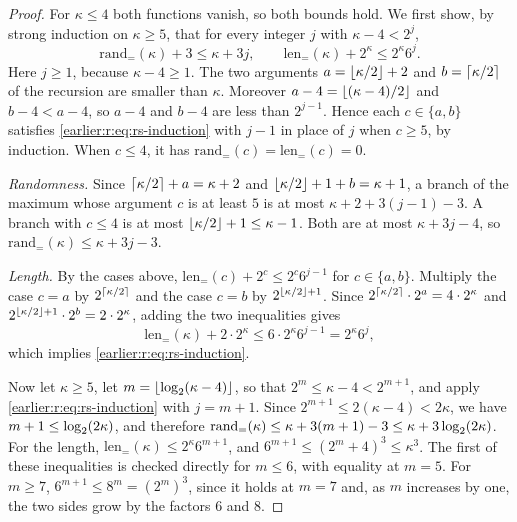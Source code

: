 \begin{proof}
For \(\kappa\le4\) both functions vanish, so both bounds hold. We first
show, by strong induction on \(\kappa\ge5\), that for every integer
\(j\) with \(\kappa-4<2^j\),
\begin{equation}\label{earlier:r:eq:rs-induction}
 \mathrm{rand}_=(\kappa)+3\le\kappa+3j,\qquad
 \mathrm{len}_=(\kappa)+2^\kappa\le2^\kappa6^j.
\end{equation}
Here \(j\ge1\), because \(\kappa-4\ge1\). The two arguments
\(a=\left\lfloor\kappa/2\right\rfloor+2\) and \(b=\left\lceil\kappa/2\right\rceil\) of the recursion are
smaller than \(\kappa\). Moreover \(a-4=\left\lfloor(\kappa-4)/2\right\rfloor\) and
\(b-4<a-4\), so \(a-4\) and \(b-4\) are less than \(2^{j-1}\). Hence each
\(c\in\{a,b\}\) satisfies \eqref{earlier:r:eq:rs-induction} with \(j-1\) in place
of \(j\) when \(c\ge5\), by induction. When \(c\le4\), it has
\(\mathrm{rand}_=(c)=\mathrm{len}_=(c)=0\).

\emph{Randomness.} Since \(\left\lceil\kappa/2\right\rceil+a=\kappa+2\) and
\(\left\lfloor\kappa/2\right\rfloor+1+b=\kappa+1\), a branch of the maximum whose
argument \(c\) is at least \(5\) is at most \(\kappa+2+3(j-1)-3\). A
branch with \(c\le4\) is at most \(\left\lfloor\kappa/2\right\rfloor+1\le\kappa-1\). Both
are at most \(\kappa+3j-4\), so
\(\mathrm{rand}_=(\kappa)\le\kappa+3j-3\).

\emph{Length.} By the cases above,
\(\mathrm{len}_=(c)+2^c\le2^c6^{j-1}\) for \(c\in\{a,b\}\). Multiply
the case \(c=a\) by \(2^{\left\lceil\kappa/2\right\rceil}\) and the case \(c=b\) by
\(2^{\left\lfloor\kappa/2\right\rfloor+1}\). Since
\(2^{\left\lceil\kappa/2\right\rceil}\cdot2^a=4\cdot2^\kappa\) and
\(2^{\left\lfloor\kappa/2\right\rfloor+1}\cdot2^b=2\cdot2^\kappa\), adding the two
inequalities gives
\[
 \mathrm{len}_=(\kappa)+2\cdot2^\kappa
 \le6\cdot2^\kappa6^{j-1}=2^\kappa6^j,
\]
which implies \eqref{earlier:r:eq:rs-induction}.

Now let \(\kappa\ge5\), let \(m=\left\lfloor\log_2(\kappa-4)\right\rfloor\), so that
\(2^m\le\kappa-4<2^{m+1}\), and apply \eqref{earlier:r:eq:rs-induction} with
\(j=m+1\). Since \(2^{m+1}\le2(\kappa-4)<2\kappa\), we have
\(m+1\le\log_2(2\kappa)\), and therefore
\(\mathrm{rand}_=(\kappa)\le\kappa+3(m+1)-3\le\kappa+3\log_2(2\kappa)\).
For the length, \(\mathrm{len}_=(\kappa)\le2^\kappa6^{m+1}\), and
\(6^{m+1}\le(2^m+4)^3\le\kappa^3\). The first of these inequalities is
checked directly for \(m\le6\), with equality at \(m=5\). For \(m\ge7\),
\(6^{m+1}\le8^m=(2^m)^3\), since it holds at \(m=7\) and, as \(m\) increases by
one, the two sides grow by the factors \(6\) and \(8\).
\end{proof}

